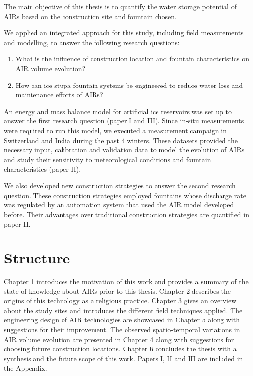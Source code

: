 The main objective of this thesis is to quantify the water storage potential of AIRs based on the construction
site and fountain chosen. 

We applied an integrated approach for this study, including field measurements and modelling, to answer the
following research questions: 

\begin{enumerate}

\item What is the influence of construction location and fountain characteristics on AIR volume evolution? 

\item How can ice stupa fountain systems be engineered to reduce water loss and maintenance efforts of AIRs?

\end{enumerate}

An energy and mass balance model for artificial ice reservoirs was set up to answer the first research question
(paper I and III). Since in-situ measurements were required to run this model, we executed a measurement campaign
in Switzerland and India during the past 4 winters. These datasets provided the necessary input, calibration and
validation data to model the evolution of AIRs and study their sensitivity to meteorological conditions and
fountain characteristics (paper II). 

We also developed new construction strategies to answer the second research question. These construction
strategies employed fountains whose discharge rate was regulated by an automation system that used the AIR model
developed before. Their advantages over traditional construction strategies are quantified in paper II.

\section{Structure}

Chapter 1 introduces the motivation of this work and provides a summary of the state of knowledge about AIRs
prior to this thesis. Chapter 2 describes the origins of this technology as a religious practice. Chapter 3
gives an overview about the study sites and introduces the different field techniques applied. The engineering
design of AIR technologies are showcased in Chapter 5 along with suggestions for their improvement. The observed
spatio-temporal variations in AIR volume evolution are presented in Chapter 4 along with suggestions for
choosing future construction locations. Chapter 6 concludes the thesis with a synthesis and the future scope of
this work. Papers I, II and III are included in the Appendix.

